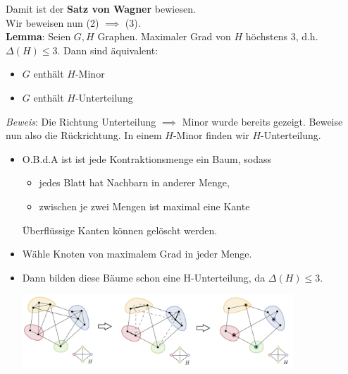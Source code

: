 Damit ist der \textbf{Satz von Wagner} bewiesen.\\

Wir beweisen nun (2) $\implies$ (3).\\

\textbf{Lemma}: Seien $G,H$ Graphen. Maximaler Grad von $H$ höchstens 3, d.h. $\Delta(H)\leq 3$. Dann sind äquivalent:
\begin{itemize}
	\item $G$ enthält $H$-Minor
	\item $G$ enthält $H$-Unterteilung
\end{itemize}

\textit{Beweis}: Die Richtung Unterteilung $\implies$ Minor wurde bereits gezeigt. Beweise nun also die Rückrichtung. In einem $H$-Minor finden wir $H$-Unterteilung.
\begin{itemize}
	\item O.B.d.A ist ist jede Kontraktionsmenge ein Baum, sodass
	\begin{itemize}
		\item jedes Blatt hat Nachbarn in anderer Menge,
		\item zwischen je zwei Mengen ist maximal eine Kante
	\end{itemize}
	Überflüssige Kanten können gelöscht werden.
	\item Wähle Knoten von maximalem Grad in jeder Menge.
	\item Dann bilden diese Bäume schon eine H-Unterteilung, da $\Delta(H)\leq 3$.
	\begin{center}
		\includegraphics[width=0.8\textwidth]{images/m-u.png}
	\end{center}
\end{itemize}
\pagebreak

